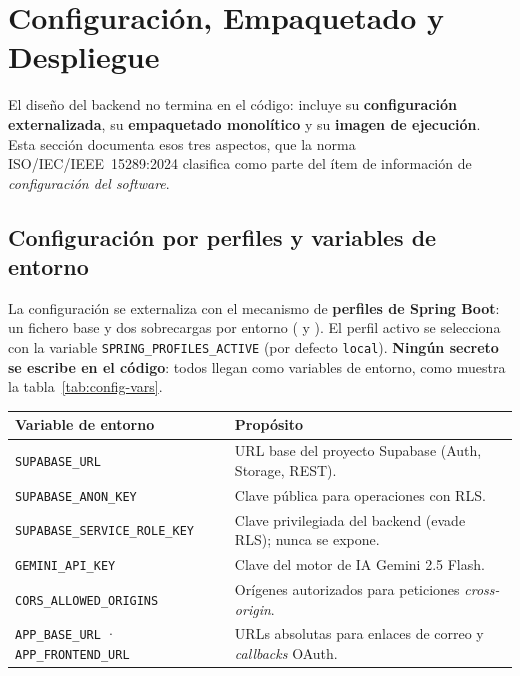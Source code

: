 \section{Configuración, Empaquetado y Despliegue}
\label{sec:config_backend}

El diseño del backend no termina en el código: incluye su \textbf{configuración
externalizada}, su \textbf{empaquetado monolítico} y su \textbf{imagen de ejecución}. Esta
sección documenta esos tres aspectos, que la norma ISO/IEC/IEEE~15289:2024 clasifica como
parte del ítem de información de \textit{configuración del software}.

\subsection{Configuración por perfiles y variables de entorno}
\label{subsec:config_perfiles}

La configuración se externaliza con el mecanismo de \textbf{perfiles de Spring Boot}: un
fichero base  y dos sobrecargas por entorno
( y ). El perfil activo se
selecciona con la variable \texttt{SPRING\_PROFILES\_ACTIVE} (por defecto \texttt{local}).
\textbf{Ningún secreto se escribe en el código}: todos llegan como variables de entorno,
como muestra la tabla~\ref{tab:config-vars}.

\vspace{0.2cm}
\noindent
\renewcommand{\arraystretch}{1.3}
\fontsize{8.5}{10.2}\selectfont\sffamily
\begin{tabularx}{\textwidth}{|L{4.2cm}|Y|}
\hline
{}
\sffamily\textbf{Variable de entorno} & \sffamily\textbf{Propósito} \\
\hline
\texttt{SUPABASE\_URL} & URL base del proyecto Supabase (Auth, Storage, REST). \\ \hline
{}
\texttt{SUPABASE\_ANON\_KEY} & Clave pública para operaciones con RLS. \\ \hline
\texttt{SUPABASE\_SERVICE\_ROLE\_KEY} & Clave privilegiada del backend (evade RLS); nunca se expone. \\ \hline
{}
\texttt{GEMINI\_API\_KEY} & Clave del motor de IA Gemini 2.5 Flash. \\ \hline
\texttt{CORS\_ALLOWED\_ORIGINS} & Orígenes autorizados para peticiones \textit{cross-origin}. \\ \hline
{}
\texttt{APP\_BASE\_URL} · \texttt{APP\_FRONTEND\_URL} & URLs absolutas para enlaces de correo y \textit{callbacks} OAuth. \\ \hline
\end{tabularx}
\label{tab:config-vars}

